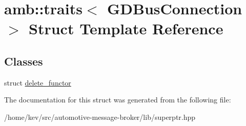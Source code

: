 \hypertarget{structamb_1_1traits_3_01GDBusConnection_01_4}{\section{amb\+:\+:traits$<$ G\+D\+Bus\+Connection $>$ Struct Template Reference}
\label{structamb_1_1traits_3_01GDBusConnection_01_4}
}
\subsection*{Classes}
\begin{DoxyCompactItemize}
\item 
struct \hyperlink{structamb_1_1traits_3_01GDBusConnection_01_4_1_1delete__functor}{delete\+\_\+functor}
\end{DoxyCompactItemize}


The documentation for this struct was generated from the following file\+:\begin{DoxyCompactItemize}
\item 
/home/kev/src/automotive-\/message-\/broker/lib/superptr.\+hpp\end{DoxyCompactItemize}
